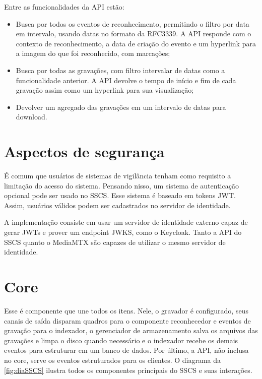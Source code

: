 \documentclass[12pt, %
openright, 
oneside, %
a4paper,    %
brazil]{facom-ufu-abntex2}
\begin{document}
Entre as funcionalidades da API estão:
\begin{itemize}
	\item Busca por todos os eventos de reconhecimento, permitindo o filtro
	      por data em intervalo, usando datas no formato da RFC3339. A API responde com o
	      contexto de reconhecimento, a data de criação do evento e um hyperlink para a
	      imagem do que foi reconhecido, com marcações;
	\item Busca por todas as gravações, com filtro intervalar de datas como
	      a funcionalidade anterior. A API devolve o tempo de início e fim de cada
	      gravação assim como um hyperlink para sua visualização;
	\item Devolver um agregado das gravações em um intervalo de datas para
	      download.
\end{itemize}

\section{Aspectos de segurança}

É comum que usuários de sistemas de vigilância tenham como requisito a
limitação do acesso do sistema. Pensando nisso, um sistema de autenticação
opcional pode ser usado no SSCS. Esse sistema é baseado em tokens JWT. Assim,
usuários válidos podem ser cadastrados no servidor de identidade.

A implementação consiste em usar um servidor de identidade externo capaz de
gerar JWTs e prover um endpoint JWKS, como o Keycloak. Tanto a API do SSCS
quanto o MediaMTX são capazes de utilizar o mesmo servidor de identidade.

\section{Core}

Esse é componente que une todos os itens. Nele, o gravador é configurado, seus
canais de saída disparam quadros para o componente reconhecedor e eventos de
gravação para o indexador, o gerenciador de armazenamento salva os arquivos das
gravações e limpa o disco quando necessário e o indexador recebe os demais
eventos para estruturar em um banco de dados. Por último, a API, não inclusa no
core, serve os eventos estruturados para os clientes. O diagrama da
\autoref{fig:diaSSCS} ilustra todos os componentes principais do SSCS e suas
interações.
\end{document}
